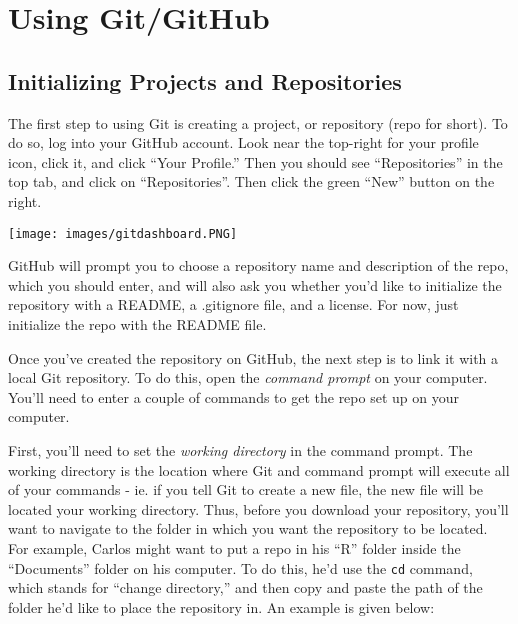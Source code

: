 \documentclass[
]{book}
\newenvironment{Shaded}{\begin{snugshade}}{\end{snugshade}}
\newcommand{\ErrorTok}[1]{\textcolor[rgb]{0.64,0.00,0.00}{\textbf{#1}}}
\newcommand{\NormalTok}[1]{#1}
\newcommand{\SpecialCharTok}[1]{\textcolor[rgb]{0.00,0.00,0.00}{#1}}
\begin{document}
\hypertarget{using-gitgithub}{%
\section{Using Git/GitHub}\label{using-gitgithub}}

\hypertarget{initializing-projects-and-repositories}{%
\subsection{Initializing Projects and Repositories}\label{initializing-projects-and-repositories}}

The first step to using Git is creating a project, or repository (repo for short). To do so, log into your GitHub account. Look near the top-right for your profile icon, click it, and click ``Your Profile.'' Then you should see ``Repositories'' in the top tab, and click on ``Repositories''. Then click the green ``New'' button on the right.

\texttt{[image: images/gitdashboard.PNG]}

GitHub will prompt you to choose a repository name and description of the repo, which you should enter, and will also ask you whether you'd like to initialize the repository with a README, a .gitignore file, and a license. For now, just initialize the repo with the README file.

Once you've created the repository on GitHub, the next step is to link it with a local Git repository. To do this, open the \emph{command prompt} on your computer. You'll need to enter a couple of commands to get the repo set up on your computer.

First, you'll need to set the \emph{working directory} in the command prompt. The working directory is the location where Git and command prompt will execute all of your commands - ie. if you tell Git to create a new file, the new file will be located your working directory. Thus, before you download your repository, you'll want to navigate to the folder in which you want the repository to be located. For example, Carlos might want to put a repo in his ``R'' folder inside the ``Documents'' folder on his computer. To do this, he'd use the \texttt{cd} command, which stands for ``change directory,'' and then copy and paste the path of the folder he'd like to place the repository in. An example is given below:

\begin{Shaded}
\end{Shaded}
\end{document}
